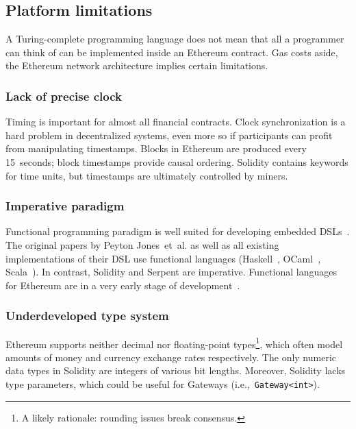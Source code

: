 


\subsection{Platform limitations}

A Turing-complete programming language does not mean that all a programmer can think of can be implemented inside an Ethereum contract.
Gas costs aside, the Ethereum network architecture implies certain limitations.

\subsubsection{Lack of precise clock}

Timing is important for almost all financial contracts.
Clock synchronization is a hard problem in decentralized systems, even more so if participants can profit from manipulating timestamps.
Blocks in Ethereum are produced every 15~seconds; block timestamps provide causal ordering.
Solidity contains keywords for time units, but timestamps are ultimately controlled by miners.


\subsubsection{Imperative paradigm}
Functional programming paradigm is well suited for developing embedded DSLs~\cite{Gibbons2015}.
The original papers by Peyton Jones~et~al. as well as all existing implementations of their DSL use functional languages (Haskell~\cite{PeytonJones2000, Jones2003, Straaten2007}, OCaml~\cite{LexiFi}, Scala~\cite{Walton2012, Chaudhary2015}).
In contrast, Solidity and Serpent are imperative.
Functional languages for Ethereum are in a very early stage of development~\cite{FpEthereum2017}.


\subsubsection{Underdeveloped type system}
Ethereum supports neither decimal nor floating-point types\footnote{A likely rationale: rounding issues break consensus.}, which often model amounts of money and currency exchange rates respectively.
The only numeric data types in Solidity are integers of various bit lengths.
Moreover, Solidity lacks type parameters, which could be useful for Gateways (i.e.,~\texttt{Gateway<int>}).




